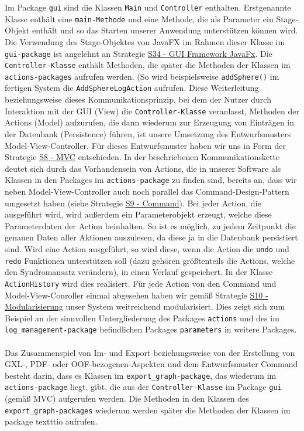 \documentclass[enabledeprecatedfontcommands,fontsize=11pt,paper=a4,twoside]{scrartcl}
\newcounter{one}
\begin{document}
Im Package \texttt{gui} sind die Klassen \texttt{Main} und \texttt{Controller} enthalten. Erstgenannte Klasse enthält eine \texttt{main-Methode} und eine Methode, die als Parameter ein Stage-Objekt enthält und so das Starten unserer Anwendung unterstützen können wird. Die Verwendung des Stage-Objektes von JavaFX im Rahmen dieser Klasse im \texttt{gui-package} ist angelehnt an Strategie \hyperlink{kkk}{S34 - GUI Framework JavaFx}. Die \texttt{Controller-Klasse} enthält Methoden, die später die Methoden der Klassen im \texttt{actions-packages} aufrufen werden. (So wird beispielsweise \texttt{addSphere()} im fertigen System die \texttt{AddSphereLogAction} aufrufen. Diese Weiterleitung beziehungsweise dieses Kommunikationsprinzip, bei dem der Nutzer durch Interaktion mit der GUI (View) die \texttt{Controller-Klasse} veranlasst, Methoden der Actions (Model) aufzurufen, die dann wiederum zur Erzeugung von Einträgen in der Datenbank (Persistence) führen, ist unsere Umsetzung des Entwurfsmusters Model-View-Controller. Für dieses Entwurfsmuster haben wir uns in Form der Strategie \hyperlink{bbb}{S8 - MVC} entschieden. In der beschriebenen Kommunikationskette deutet sich durch das Vorhandensein von Actions, die in unserer Software als Klassen in den Packages im \texttt{actions-package} zu finden sind, bereits an, dass wir neben Model-View-Controller auch noch parallel das Command-Design-Pattern umgesetzt haben (siehe Strategie \hyperlink{xcc}{S9 - Command}). Bei jeder Action, die ausgeführt wird, wird außerdem ein Parameterobjekt erzeugt, welche diese Parameterdaten der Action beinhalten. So ist es möglich, zu jedem Zeitpunkt die genauen Daten aller Aktionen auszulesen, da diese ja in die Datenbank persistiert sind. Wird eine Action ausgeführt, so wird diese, wenn die Action die \texttt{undo} und \texttt{redo} Funktionen unterstützen soll (dazu gehören größtenteils die Actions, welche den Syndromansatz verändern), in einen Verlauf gespeichert. In der Klasse \texttt{ActionHistory} wird dies realisiert. Für jede Action von den Command und Model-View-Conroller einmal abgesehen haben wir gemäß Strategie \hyperlink{xdd}{S10 - Modularisierung} unser System weitreichend modularisiert. Dies zeigt sich zum Beispiel an der sinnvollen Untergliederung des Packages \texttt{actions} und des im \texttt{log\_management-package} befindlichen Packages \texttt{parameters} in weitere Packages.\\ \\

Das Zusammenspiel von Im- und Export beziehungsweise von der Erstellung von GXL-, PDF- oder OOF-bezogenen-Aspekten und dem Entwurfsmuster Command besteht darin, dass es Klassen im \texttt{export\_graph-package}, das wiederum im \texttt{actions-package} liegt, gibt, die aus der \texttt{Controller-Klasse} im Package \texttt{gui} (gemäß MVC) aufgerufen werden. Die Methoden in den Klassen des \texttt{export\_graph-packages} wiederum werden später die Methoden der Klassen im package texttt{io} aufrufen. \\
\end{document}
